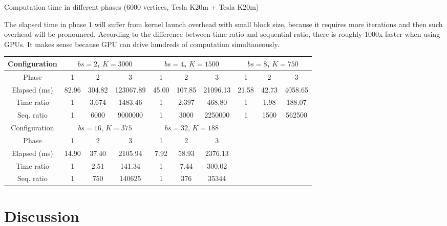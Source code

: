 \documentclass[12pt]{article}
\makeatletter
\renewenvironment{itemize}
{\list{$\bullet$}{\leftmargin\z@ \labelwidth\z@ \itemindent-\leftmargin
\let\makelabel\descriptionlabel}}
{\endlist}
\makeatother
\begin{document}
\begin{itemize}
    \item Computation time in different phases (6000 vertices, Tesla K20m + Tesla K20m)
    \begin{flushleft}
        The elapsed time in phase 1 will suffer from kernel launch overhead with small block size, because it requires more iterations and then such overhead will be pronounced. According to the difference between time ratio and sequential ratio, there is roughly 1000x faster when using GPUs. It makes sense because GPU can drive hundreds of computation simultaneously.
    \end{flushleft}
    \begin{center}
    \begin{tabular}{|c|c|c|c|c|c|c|c|c|c|}
        \hline
        Configuration & \multicolumn{3}{c|}{$bs = 2$, $K = 3000$} & \multicolumn{3}{c|}{$bs = 4$, $K = 1500$} & \multicolumn{3}{c|}{$bs = 8$, $K = 750$} \\
        \hline
        Phase & 1 & 2 & 3 & 1 & 2 & 3 & 1 & 2 & 3 \\
        \hline
        Elapsed (ms) & 82.96 & 304.82 & 123067.89 & 45.00 & 107.85 & 21096.13 & 21.58 & 42.73 & 4058.65 \\
        \hline
        Time ratio & 1 & 3.674 & 1483.46 & 1 & 2.397 & 468.80 & 1 & 1.98 & 188.07 \\
        \hline
        Seq. ratio & 1 & 6000 & 9000000 & 1 & 3000 & 2250000 & 1 & 1500 & 562500 \\
        \hhline{|==========|}
        Configuration & \multicolumn{3}{c|}{$bs = 16$, $K = 375$} & \multicolumn{3}{c|}{$bs = 32$, $K = 188$} & \multicolumn{3}{c|}{} \\
        \hline
        Phase & 1 & 2 & 3 & 1 & 2 & 3 & & & \\
        \hline
        Elapsed (ms) & 14.90 & 37.40 & 2105.94 & 7.92 & 58.93 & 2376.13 & & & \\
        \hline
        Time ratio & 1 & 2.51 & 141.34 & 1 & 7.44 & 300.02 & & & \\
        \hline
        Seq. ratio & 1 & 750 & 140625 & 1 & 376 & 35344 & & & \\
        \hline
    \end{tabular}
    \end{center}
\end{itemize}

\newpage

\vspace{-10pt}
\section*{Discussion}
\vspace{-20pt}
\noindent\makebox[\linewidth]{\rule{\textwidth}{0.4pt}}
\end{document}
